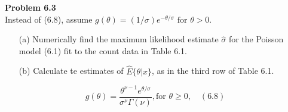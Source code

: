 \documentclass{article}
\theoremstyle{definition}
\theoremstyle{definition}
\theoremstyle{remark}
\newenvironment{problem}[2][Problem]
    { \begin{mdframed}[backgroundcolor=gray!20] \textbf{#1 #2} \\}
    {  \end{mdframed}}
\begin{document}
  
    \begin{problem}{6.3}
    Instead of (6.8), assume $g(\theta) = (1/ \sigma) e^{-\theta/ \sigma} \text{ for } \theta > 0.$
    \begin{itemize}
        \item [(a)] Numerically find the maximum likelihood estimate $\hat{\sigma}$ for the Poisson model (6.1) fit to the count data in Table 6.1.
        \item [(b)] Calculate te estimates of $\hat{E} \{ \theta|x \}$, as in the third row of Table 6.1.
    \end{itemize}

    $$g(\theta) = \frac{\theta^{\nu -1}e^{\theta/\sigma}}{\sigma^{\nu} \Gamma(\nu)}, \text{for } \theta \geq 0, \quad (6.8)$$
    \end{problem}
    
\end{document}

